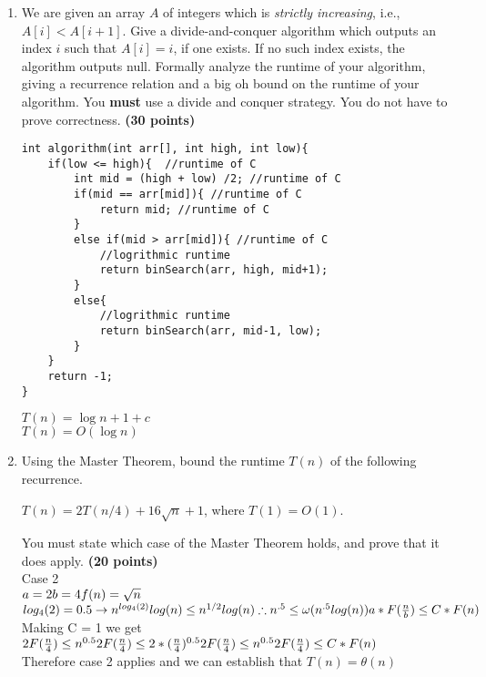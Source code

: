 \documentclass[11pt]{amsart}
\begin{document}
\begin{enumerate}
\item We are given an array $A$ of integers which is \textit{strictly increasing}, i.e., $A[i] < A[i+1]$. Give a divide-and-conquer algorithm which outputs an index $i$ such that $A[i] = i$, if one exists. If no such index exists, the algorithm outputs null. Formally analyze the runtime of your algorithm, giving a recurrence relation and a big oh bound on the runtime of your algorithm. You \textbf{must} use a divide and conquer strategy. You do not have to prove correctness. \textbf{(30 points)}

\begin{lstlisting}
int algorithm(int arr[], int high, int low){
	if(low <= high){  //runtime of C
		int mid = (high + low) /2; //runtime of C
		if(mid == arr[mid]){ //runtime of C
			return mid; //runtime of C
		}
		else if(mid > arr[mid]){ //runtime of C
			//logrithmic runtime
			return binSearch(arr, high, mid+1); 
		}
		else{
			//logrithmic runtime
			return binSearch(arr, mid-1, low); 
		}
	}
	return -1;
}
\end{lstlisting}
$T(n) = \log n + 1 + c$\\
$T(n) = O(\log n)$ 
\bigskip

\item Using the Master Theorem, bound the runtime $T(n)$ of the following recurrence. 
\begin{center}
$T(n) = 2T(n/4) + 16\sqrt{n} + 1$, where $T(1) = O(1)$.
\end{center}
You must state which case of the Master Theorem holds, and prove that it does apply. \textbf{(20 points)}
\\Case 2\\
$a = 2\\b = 4\\f(n) = \sqrt{n}$ \hspace{10pt}  $log_4(2)=0.5 \rightarrow n^{log_4(2)}log(n)\leq n^{1/2}log(n)\\ \therefore n^{.5} \leq \omega (n^{.5}log(n))\\a*F(\frac{n}{b})\leq C*F(n)$ \hspace{3pt} Making C = 1 we get \\ $2F(\frac{n}{4})\leq n^{0.5}\\ 2F(\frac{n}{4})\leq 2 * (\frac{n}{4})^{0.5}\\ 2F(\frac{n}{4})\leq n^{0.5}\\2F(\frac{n}{4})\leq C*F(n)$\\Therefore case 2 applies and we can establish that $T(n) = \theta(n)$
\bigskip


\end{enumerate}
\end{document}
